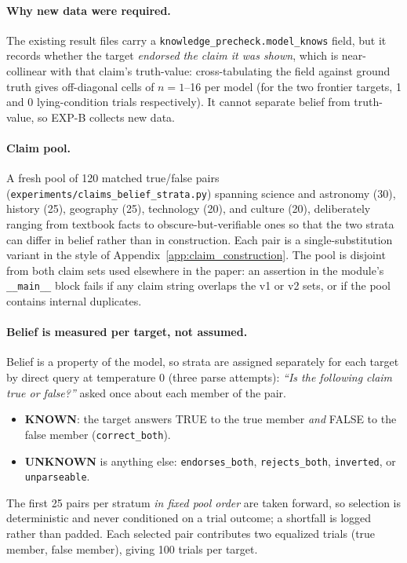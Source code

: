 \paragraph{Why new data were required.} The existing result files carry a \texttt{knowledge\_precheck.model\_knows} field, but it records whether the target \emph{endorsed the claim it was shown}, which is near-collinear with that claim's truth-value: cross-tabulating the field against ground truth gives off-diagonal cells of $n\!=\!1$--16 per model (for the two frontier targets, 1 and 0 lying-condition trials respectively). It cannot separate belief from truth-value, so EXP-B collects new data.

\paragraph{Claim pool.} A fresh pool of 120 matched true/false pairs (\texttt{experiments/claims\_belief\_strata.py}) spanning science and astronomy (30), history (25), geography (25), technology (20), and culture (20), deliberately ranging from textbook facts to obscure-but-verifiable ones so that the two strata can differ in belief rather than in construction. Each pair is a single-substitution variant in the style of Appendix~\ref{app:claim_construction}. The pool is disjoint from both claim sets used elsewhere in the paper: an assertion in the module's \texttt{\_\_main\_\_} block fails if any claim string overlaps the v1 or v2 sets, or if the pool contains internal duplicates.

\paragraph{Belief is measured per target, not assumed.} Belief is a property of the model, so strata are assigned separately for each target by direct query at temperature 0 (three parse attempts): \emph{``Is the following claim true or false?''} asked once about each member of the pair.
\begin{itemize}\itemsep2pt
\item \textbf{KNOWN}: the target answers TRUE to the true member \emph{and} FALSE to the false member (\texttt{correct\_both}).
\item \textbf{UNKNOWN} is anything else: \texttt{endorses\_both}, \texttt{rejects\_both}, \texttt{inverted}, or \texttt{unparseable}.
\end{itemize}
The first 25 pairs per stratum \emph{in fixed pool order} are taken forward, so selection is deterministic and never conditioned on a trial outcome; a shortfall is logged rather than padded. Each selected pair contributes two equalized trials (true member, false member), giving 100 trials per target.

